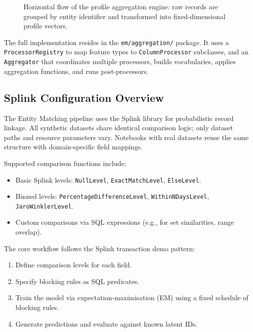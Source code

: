 \begin{figure}[htbp]
	\caption{Horizontal flow of the profile aggregation engine: raw records are grouped by entity identifier and transformed into fixed‑dimensional profile vectors.}
	\label{fig:profile_agg_flow}
\end{figure}

The full implementation resides in the \texttt{em/aggregation/} package. It uses a \texttt{ProcessorRegistry} to map feature types to \texttt{ColumnProcessor} subclasses, and an \texttt{Aggregator} that coordinates multiple processors, builds vocabularies, applies aggregation functions, and runs post‑processors.

\subsection{Splink Configuration Overview}
\label{sec:splink_config}
The Entity Matching pipeline uses the Splink library for probabilistic record linkage.
All synthetic datasets share identical comparison logic; only dataset paths and resource parameters vary.
Notebooks with real datasets reuse the same structure with domain‑specific field mappings.

Supported comparison functions include:
\begin{itemize}
	\item Basic Splink levels: \texttt{NullLevel}, \texttt{ExactMatchLevel}, \texttt{ElseLevel}.
	\item Binned levels: \texttt{PercentageDifferenceLevel}, \texttt{WithinNDaysLevel}, \texttt{JaroWinklerLevel}.
	\item Custom comparisons via SQL expressions (e.g., for set similarities, range overlap).
\end{itemize}

The core workflow follows the Splink transaction demo pattern:
\begin{enumerate}
	\item Define comparison levels for each field.
	\item Specify blocking rules as SQL predicates.
	\item Train the model via expectation‑maximisation (EM) using a fixed schedule of blocking rules.
	\item Generate predictions and evaluate against known latent IDs.
\end{enumerate}

